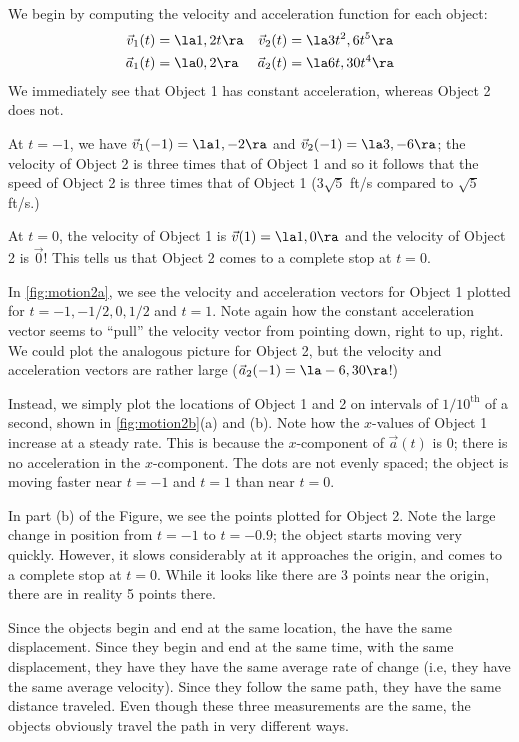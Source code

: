 {We begin by computing the velocity and acceleration function for each object:
\begin{align*}
\vec v_1(t) &= \la 1,2t\ra & \vec v_2(t) &= \la 3t^2,6t^5\ra \\
\vec a_1(t) &= \la 0,2\ra & \vec a_2(t) &=\la 6t,30t^4\ra
\end{align*}
We immediately see that Object 1 has constant acceleration, whereas Object 2 does not. 

At $t=-1$, we have $\vec v_1(-1) = \la 1,-2\ra$ and $\vec v_2(-1) = \la 3,-6\ra$; the velocity of Object 2 is three times that of Object 1 and so it follows that the speed of Object 2 is three times that of Object 1 ($3\sqrt{5}$ ft/s compared to $\sqrt{5}$ ft/s.)

At $t=0$, the velocity of Object 1 is $\vec v(1) = \la 1,0\ra$ and the velocity of Object 2 is $\vec 0$! This tells us that Object 2 comes to a complete stop at $t=0$. 

In \autoref{fig:motion2a}, we see the velocity and acceleration vectors for Object 1 plotted for $t=-1, -1/2, 0, 1/2$ and $t=1$. Note again how the constant acceleration vector seems to ``pull'' the velocity vector from pointing down, right to up, right. We could plot the analogous picture for Object 2, but the velocity and acceleration vectors are rather large ($\vec a_2(-1) = \la -6,30\ra$!) 

Instead, we simply plot the locations of Object 1 and 2  on intervals of $1/10^{\text{th}}$ of a second, shown in \autoref{fig:motion2b}(a) and (b). Note how the $x$-values of Object 1 increase at a steady rate. This is because the $x$-component of $\vec a(t)$ is 0; there is no acceleration in the $x$-component. The dots are not evenly spaced; the object is moving faster near $t=-1$ and $t=1$ than near $t=0$.

In part (b) of the Figure, we see the points plotted for Object 2. Note the large change in position from $t=-1$ to $t=-0.9$; the object starts moving very quickly. However, it slows considerably at it approaches the origin, and comes to a complete stop at $t=0$. While it looks like there are 3 points near the origin, there are in reality 5 points there.

Since the objects begin and end at the same location, the have the same displacement. Since they begin and end at the same time, with the same displacement, they have they have the same average rate of change (i.e, they have the same average velocity). Since they follow the same path, they have the same distance traveled. Even though these three measurements are the same, the objects obviously travel the path in very different ways.}

